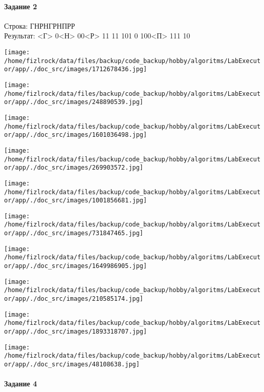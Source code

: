 \documentclass[a4paper, 12pt]{article}
\begin{document}
\paragraph{Задание 2}

Строка: 
ГНРНГРНПРР\\
Результат: <Г> 0<Н> 00<Р> 11 11 101 0 100<П> 111 10

\texttt{[image: /home/fizlrock/data/files/backup/code\_backup/hobby/algoritms/LabExecutor/app/./doc\_src/images/1712678436.jpg]}

\texttt{[image: /home/fizlrock/data/files/backup/code\_backup/hobby/algoritms/LabExecutor/app/./doc\_src/images/248890539.jpg]}

\texttt{[image: /home/fizlrock/data/files/backup/code\_backup/hobby/algoritms/LabExecutor/app/./doc\_src/images/1601036498.jpg]}

\texttt{[image: /home/fizlrock/data/files/backup/code\_backup/hobby/algoritms/LabExecutor/app/./doc\_src/images/269903572.jpg]}

\texttt{[image: /home/fizlrock/data/files/backup/code\_backup/hobby/algoritms/LabExecutor/app/./doc\_src/images/1001856681.jpg]}

\texttt{[image: /home/fizlrock/data/files/backup/code\_backup/hobby/algoritms/LabExecutor/app/./doc\_src/images/731847465.jpg]}

\texttt{[image: /home/fizlrock/data/files/backup/code\_backup/hobby/algoritms/LabExecutor/app/./doc\_src/images/1649986905.jpg]}

\texttt{[image: /home/fizlrock/data/files/backup/code\_backup/hobby/algoritms/LabExecutor/app/./doc\_src/images/210585174.jpg]}

\texttt{[image: /home/fizlrock/data/files/backup/code\_backup/hobby/algoritms/LabExecutor/app/./doc\_src/images/1893318707.jpg]}

\texttt{[image: /home/fizlrock/data/files/backup/code\_backup/hobby/algoritms/LabExecutor/app/./doc\_src/images/48108638.jpg]}
\pagebreak
\paragraph{Задание 4}
\end{document}
